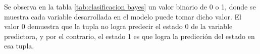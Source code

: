 \begin{table}[H]
\centering
\setlength{\tabcolsep}{10pt}
\caption{Predicciones probabilísticas con clasificación final Bayes}
\label{tab:clasificacion bayes}
\end{table}
        
    Se observa en la tabla \ref{tab:clasificacion bayes} un valor binario de 0 o 1, donde se muestra cada variable
desarrollada en el modelo puede tomar dicho valor. El valor 0 demuestra
que la tupla no logra predecir el estado 0 de la variable predictora, y
por el contrario, el estado 1 es que logra la predicción del estado en
esa tupla.


